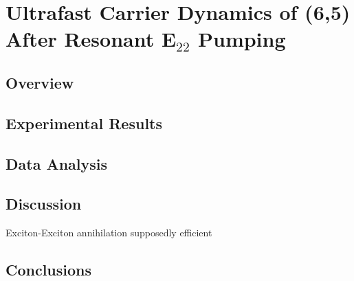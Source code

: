 \chapter{Ultrafast Carrier Dynamics of (6,5) After Resonant E$_{22}$ Pumping}

\section{Overview}

\section{Experimental Results}


\section{Data Analysis}

\section{Discussion}
Exciton-Exciton annihilation supposedly efficient \cite{murakami2009existence}


\section{Conclusions}